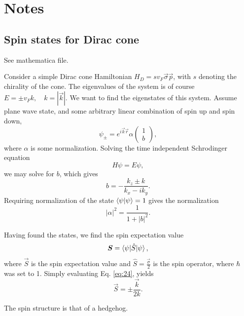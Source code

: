 \section{Notes}
\subsection{Spin states for Dirac cone}
See mathematica file.

Consider a simple Dirac cone Hamiltonian \(H_{D} = s v_{F} \vec{\sigma} \vec{p}\), with \(s\) denoting the chirality of the cone.
The eigenvalues of the system is of course \(E = \pm v_{F} k, \quad k=|\vec{k}|\).
We want to find the eigenstates of this system.
Assume plane wave state, and some arbitrary linear combination of spin up and spin down,
\[
  \psi _{\pm} = e^{i \vec{k} \vec{r}} \alpha
  \begin{pmatrix}
    1\\
    b
  \end{pmatrix},
\]
where \(\alpha \) is some normalization.
Solving the time independent Schrodinger equation
\[
H \psi = E \psi,
\]
we may solve for \(b\), which gives
\begin{equation}
  \label{eq:23}
  b = -\frac{k_{z} \pm k}{k_{x} - i k_{y}}.
\end{equation}
Requiring normalization of the state \(\braket{\psi | \psi } = 1\) gives the normalization
\[
|\alpha |^2 = \frac{1}{1 + |b|^2}.
\]

Having found the states, we find the spin expectation value
\begin{equation}
  \label{eq:24}
  \bm{S} = \braket{\psi | \hat{S} | \psi },
\end{equation}
where \(\vec{S}\) is the spin expectation value and \(\hat{S} = \frac{\vec{\sigma}}{2} \) is the spin operator, where \(\hbar \) was set to 1.
Simply evaluating Eq. \eqref{eq:24}, yields
\begin{equation}
  \label{eq:25}
  \vec{S} = \pm \frac{\vec{k}}{2 k}.
\end{equation}

The spin structure is that of a hedgehog.

